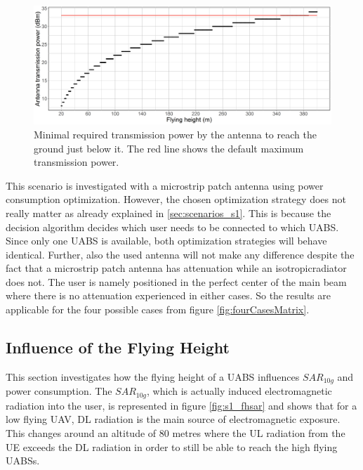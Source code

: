 \begin{figure}[h]
  \centering
  \includegraphics[width=\textwidth]{../results/s1/ptx.png}
  \caption{Minimal required transmission power by the antenna to reach the ground just below it. The red line shows the default maximum transmission power.}
  \label{fig:ptxfh}
\end{figure}

This scenario is investigated with a microstrip patch antenna using power consumption optimization. 
 However, the chosen optimization strategy does not really matter as already explained in  \ref{sec:scenarios_s1}. This is because the decision 
 algorithm decides which user 
needs to be connected to which \gls{UABS}. Since only one \gls{UABS} is available, both optimization strategies will behave identical.
Further, also the used antenna will not make any difference
despite the fact that a microstrip patch antenna has attenuation while an \gls{isotropicradiator} does not.
The user is namely positioned in the perfect center of the main beam where there is 
no attenuation experienced in either cases. So the results are applicable for the four possible cases from figure \ref{fig:fourCasesMatrix}.

\FloatBarrier
\subsection{Influence of the Flying Height}
\label{sub:senario1_influenceOfFlyHeight}

This section investigates how the flying height of a \gls{UABS} influences $SAR_{10g}$ and power consumption.
The $SAR_{10g}$, which is actually induced electromagnetic radiation into the user, is represented in figure \ref{fig:s1_fhsar}
and shows that for a low flying \gls{UAV}, \gls{DL} radiation is the main source of electromagnetic exposure.
This changes around an altitude of 80 metres where the \gls{UL} radiation from the \gls{UE}
exceeds the \gls{DL} radiation in order to still be able to reach the high flying \gls{UABS}s.

